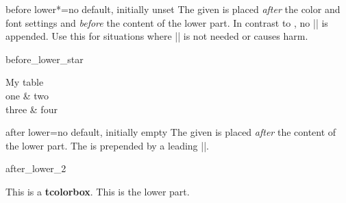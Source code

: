 \begin{docTcbKey}[][doc new=2019-02-26]{before lower*}{=}{no default, initially unset}
  The given  is placed \emph{after} the color and font settings
  and \emph{before} the content of the lower part.
  In contrast to , no |\ignorespaces| is appended.
  Use this for situations where |\ignorespaces| is not needed or causes harm.
\begin{exdispExample}{before_lower_star}
\begin{tcolorbox}[size=small,bicolor,sidebyside,center lower,
  colback=yellow!30,colbacklower=yellow!20,colframe=yellow!80!black,
  before lower*=\begin{tabular}{cc},
  after lower*=\end{tabular},
]
My table
\tcblower
  \\
  one & two \\
  three & four\\
\end{tcolorbox}
\end{exdispExample}
\end{docTcbKey}


\clearpage

\begin{docTcbKey}[][doc updated=2016-10-21]{after lower}{=}{no default, initially empty}
  The given  is placed \emph{after} the content of the lower part.
  The  is prepended by a leading |\unskip|.


\begin{exdispExample}{after_lower_2}
\begin{tcolorbox}[after lower=\ \textit{This is the end.},
  colback=red!5!white,colframe=red!75!black]
This is a \textbf{tcolorbox}.
\tcblower
This is the lower part.
\end{tcolorbox}
\end{exdispExample}
\end{docTcbKey}


